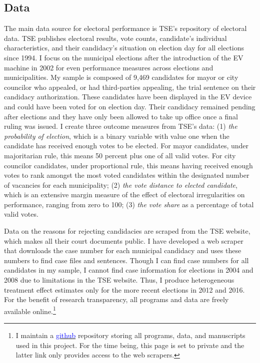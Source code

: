 \documentclass[11pt]{article}
\begin{document}
\subsection{Data} \label{subsec:data_paper1}

The main data source for electoral performance is TSE's repository of electoral data. TSE publishes electoral results, vote counts, candidate's individual characteristics, and their candidacy's situation on election day for all elections since 1994. I focus on the municipal elections after the introduction of the EV machine in 2002 for even performance measures across elections and municipalities. My sample is composed of 9,469 candidates for mayor or city councilor who appealed, or had third-parties appealing, the trial sentence on their candidacy authorization. These candidates have been displayed in the EV device and could have been voted for on election day. Their candidacy remained pending after elections and they have only been allowed to take up office once a final ruling was issued. I create three outcome measures from TSE's data: (1) \emph{the probability of election}, which is a binary variable with value one when the candidate has received enough votes to be elected. For mayor candidates, under majoritarian rule, this means 50 percent plus one of all valid votes. For city councilor candidates, under proportional rule, this means having received enough votes to rank amongst the most voted candidates within the designated number of vacancies for each municipality; (2) \emph{the vote distance to elected candidate}, which is an extensive margin measure of the effect of electoral irregularities on performance, ranging from zero to 100; (3) \emph{the  vote share} as a percentage of total valid votes.

Data on the reasons for rejecting candidacies are scraped from the TSE website, which makes all their court documents public. I have developed a web scraper that downloads the case number for each municipal candidacy and uses these numbers to find case files and sentences. Though I can find case numbers for all candidates in my sample, I cannot find case information for elections in 2004 and 2008 due to limitations in the TSE website. Thus, I produce heterogeneous treatment effect estimates only for the more recent elections in 2012 and 2016. For the benefit of research transparency, all programs and data are freely available online.\footnote{I maintain a \href{https://www.github.com/aassumpcao/tse-scraper}{\textcolor{blue}{github}} repository storing all programs, data, and manuscripts used in this project. For the time being, this page is set to private and the latter link only provides access to the web scrapers.}
\end{document}
